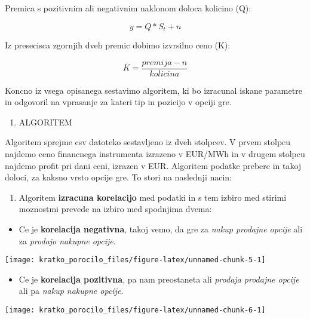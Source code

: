 \documentclass[
]{article}
\providecommand{\tightlist}{%
  \setlength{\itemsep}{0pt}\setlength{\parskip}{0pt}}
\begin{document}
Premica s pozitivnim ali negativnim naklonom doloca kolicino (Q):

\[ y =  Q * S_t + n\]

Iz presecisca zgornjih dveh premic dobimo izvrsilno ceno (K):

\[ K = \frac{premija - n}{kolicina} \]

Koncno iz vsega opisanega sestavimo algoritem, ki bo izracunal iskane
parametre in odgovoril na vprasanje za kateri tip in pozicijo v opciji
gre.

\begin{enumerate}
\def\labelenumi{\arabic{enumi}.}
\setcounter{enumi}{2}
\tightlist
\item
  ALGORITEM
\end{enumerate}

Algoritem sprejme csv datoteko sestavljeno iz dveh stolpcev. V prvem
stolpcu najdemo ceno financnega instrumenta izrazeno v EUR/MWh in v
drugem stolpcu najdemo profit pri dani ceni, izrazen v EUR. Algoritem
podatke prebere in takoj doloci, za kaksno vrsto opcije gre. To stori na
naslednji nacin:

\begin{enumerate}
\def\labelenumi{\arabic{enumi}.}
\tightlist
\item
  Algoritem \textbf{izracuna korelacijo} med podatki in s tem izbiro med
  stirimi moznostmi prevede na izbiro med spodnjima dvema:
\end{enumerate}

\begin{itemize}
\tightlist
\item
  Ce je \textbf{korelacija negativna}, takoj vemo, da gre za \emph{nakup
  prodajne opcije} ali za \emph{prodajo nakupne opcije}.
\end{itemize}

\begin{center}\texttt{[image: kratko\_porocilo\_files/figure-latex/unnamed-chunk-5-1]} \end{center}

\begin{itemize}
\tightlist
\item
  Ce je \textbf{korelacija pozitivna}, pa nam preostaneta ali
  \emph{prodaja prodajne opcije} ali pa \emph{nakup nakupne opcije}.
\end{itemize}

\begin{center}\texttt{[image: kratko\_porocilo\_files/figure-latex/unnamed-chunk-6-1]} \end{center}
\end{document}

